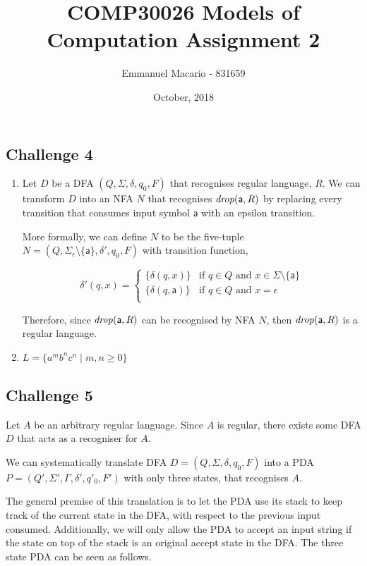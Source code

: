 \documentclass[12pt]{article}
\author{Emmanuel Macario - 831659}
\title{COMP30026 Models of Computation Assignment 2}
\date{October, 2018}
\newcommand{\id}[1]{\mbox{\textit{#1}}}
\newcommand{\ma}{\mathsf{a}}
\begin{document}
\maketitle

\subsection*{Challenge 4}

\begin{enumerate}
\item
Let $D$ be a DFA $(Q,\Sigma,\delta,q_0,F)$ that recognises regular language, $R$. We can transform 
$D$ into an NFA $N$ that recognises $\id{drop}(\ma,R)$ by replacing every transition that consumes input symbol
$\ma$ with an epsilon transition.

\bigskip
\noindent
More formally, we can define $N$ to be the five-tuple $N=(Q,\Sigma_\epsilon \setminus \{\ma\},\delta',q_0,F)$
with transition function,

\[
  \delta'(q, x) =
  \begin{cases}
  	\{\delta (q, x)\}     & \text{if $q \in Q$ and $x \in \Sigma \setminus \{\ma\}$} \\
      \{\delta (q, \ma)\} & \text{if $q \in Q$ and $x = \epsilon$} \\
  \end{cases}
\]

\bigskip
\noindent
Therefore, since $\id{drop}(\ma,R)$ can be recognised by NFA $N$, then $\id{drop}(\ma,R)$ is a regular language.
\bigskip

\item $L=\{a^m b^n c^n \mid m, n \geq 0\}$
\end{enumerate}
\bigskip


\subsection*{Challenge 5}

Let $A$ be an arbitrary regular language. Since $A$ is regular, there exists some DFA $D$ that acts as a recogniser for $A$.

\bigskip
\noindent
We can systematically translate DFA $D=(Q,\Sigma,\delta,q_0,F)$ into a PDA $P=(Q',\Sigma',\Gamma,\delta',q'_0,F')$ with only three states, that recognises $A$.

\bigskip
\noindent
The general premise of this translation is to let the PDA use its stack to keep track
of the current state in the DFA, with respect to the previous input consumed. Additionally, 
we will only allow the PDA to accept an input string if the state on top of the stack is an original 
accept state in the DFA. The three state PDA can be seen as follows.
\end{document}
